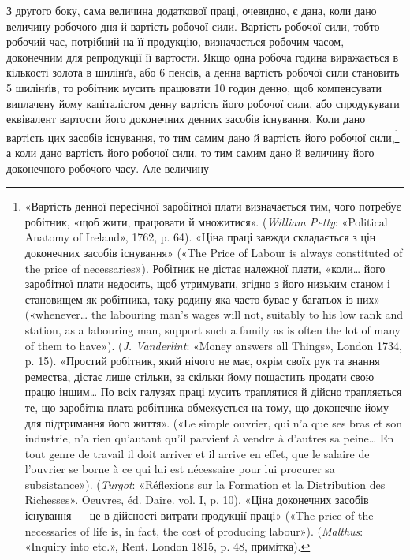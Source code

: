 З другого боку, сама величина додаткової праці, очевидно,
є дана, коли дано величину робочого дня й вартість робочої
сили. Вартість робочої сили, тобто робочий час, потрібний на її
продукцію, визначається робочим часом, доконечним для репродукції
її вартости. Якщо одна робоча година виражається в
кількості золота в  шилінґа, або 6 пенсів, а денна вартість робочої
сили становить 5 шилінґів, то робітник мусить працювати
10 годин денно, щоб компенсувати виплачену йому капіталістом
денну вартість його робочої сили, або спродукувати еквівалент
вартости його доконечних денних засобів існування. Коли дано
вартість цих засобів існування, то тим самим дано й вартість його
робочої сили,\footnote{
«Вартість денної пересічної заробітної плати визначається тим,
чого потребує робітник, «щоб жити, працювати й множитися». (\emph{William
Petty}: «Political Anatomy of Ireland», 1762, p. 64). «Ціна праці
завжди складається з цін доконечних засобів існування» («The Price of
Labour is always constituted of the price of necessaries»). Робітник не дістає
належної плати, «коли\dots{} його заробітної плати недосить, щоб утримувати,
згідно з його низьким станом і становищем як робітника, таку родину
яка часто буває у багатьох із них» («whenever\dots{} the labouring man’s
wages will not, suitably to his low rank and station, as a labouring man,
support such a family as is often the lot of many of them to have»).
(\emph{J. Vanderlint}: «Money answers all Things», London 1734, p. 15). «Простий
робітник, який нічого не має, окрім своїх рук та знання ремества, дістає
лише стільки, за скільки йому пощастить продати свою працю іншим\dots{}
По всіх галузях праці мусить траплятися й дійсно трапляється те, що
заробітна плата робітника обмежується на тому, що доконечне йому
для підтримання його життя». («Le simple ouvrier, qui n’a que ses bras
et son industrie, n’a rien qu’autant qu’il parvient à vendre à d’autres sa
peine\dots{} En tout genre de travail il doit arriver et il arrive en effet, que le
salaire de l’ouvrier se borne à ce qui lui est nécessaire pour lui procurer
sa subsistance»). (\emph{Turgot}: «Réflexions sur la Formation et la Distribution
des Richesses». Oeuvres, éd. Daire. vol. I, p. 10). «Ціна доконечних
засобів існування — це в дійсності витрати продукції праці» («The
price of the necessaries of life is, in fact, the cost of producing labour»).
(\emph{Malthus}: «Inquiry into etc.», Rent. London 1815, p. 48, примітка).
} а коли дано вартість його робочої сили, то тим
самим дано й величину його доконечного робочого часу. Але величину
